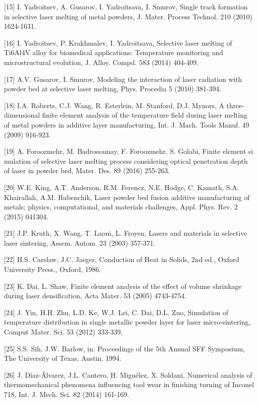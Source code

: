 \documentclass[10pt]{article}
\begin{document}
[15] I. Yadroitsev, A. Gusarov, I. Yadroitsava, I. Smurov, Single track formation in selective laser melting of metal powders, J. Mater. Process Technol. 210 (2010) 1624-1631.

[16] I. Yadroitsev, P. Krakhmalev, I. Yadroitsava, Selective laser melting of Ti6Al4V alloy for biomedical applications: Temperature monitoring and microstructural evolution, J. Alloy. Compd. 583 (2014) 404-409.

[17] A.V. Gusarov, I. Smurov, Modeling the interaction of laser radiation with powder bed at selective laser melting, Phys. Procedia 5 (2010) 381-394.

[18] I.A. Roberts, C.J. Wang, R. Esterlein, M. Stanford, D.J. Mynors, A three-dimensional finite element analysis of the temperature field during laser melting of metal powders in additive layer manufacturing, Int. J. Mach. Tools Manuf. 49 (2009) 916-923.

[19] A. Foroozmehr, M. Badrossamay, F. Foroozmehr, S. Golabi, Finite element si mulation of selective laser melting process considering optical penetration depth of laser in powder bed, Mater. Des. 89 (2016) 255-263.

[20] W.E. King, A.T. Anderson, R.M. Ferencz, N.E. Hodge, C. Kamath, S.A. Khairallah, A.M. Rubenchik, Laser powder bed fusion additive manufacturing of metals; physics, computational, and materials challenges, Appl. Phys. Rev. 2 (2015) 041304.

[21] J.P. Kruth, X. Wang, T. Laoui, L. Froyen, Lasers and materials in selective laser sintering, Assem. Autom. 23 (2003) 357-371.

[22] H.S. Carslaw, J.C. Jaeger, Conduction of Heat in Solids, 2nd ed., Oxford University Press,, Oxford, 1986.

[23] K. Dai, L. Shaw, Finite element analysis of the effect of volume shrinkage during laser densification, Acta Mater. 53 (2005) 4743-4754.

[24] J. Yin, H.H. Zhu, L.D. Ke, W.J. Lei, C. Dai, D.L. Zuo, Simulation of temperature distribution in single metallic powder layer for laser micro-sintering, Comput Mater. Sci. 53 (2012) 333-339,

[25] S.S. Sih, J.W. Barlow, in: Proceedings of the 5th Annual SFF Symposium, The University of Texas, Austin, 1994.

[26] J. Díaz-Álvarez, J.L. Cantero, H. Miguélez, X. Soldani, Numerical analysis of thermomechanical phenomena influencing tool wear in finishing turning of Inconel 718, Int. J. Mech. Sci. 82 (2014) 161-169.
\end{document}
